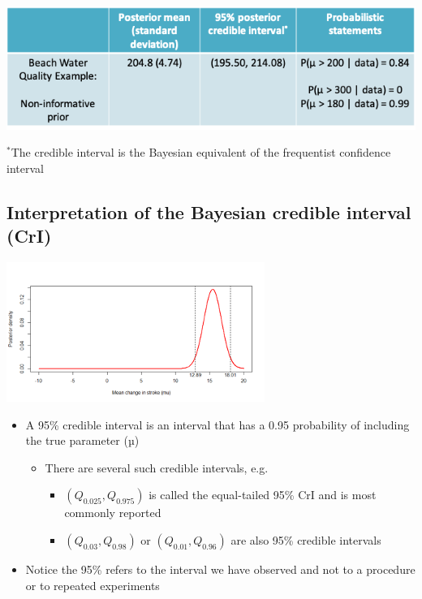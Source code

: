 \documentclass[
]{book}
\providecommand{\tightlist}{%
  \setlength{\itemsep}{0pt}\setlength{\parskip}{0pt}}
\begin{document}
\includegraphics[width=1\linewidth]{./6_26}

\(^*\)The credible interval is the Bayesian equivalent of the frequentist confidence interval

\hypertarget{interpretation-of-the-bayesian-credible-interval-cri}{%
\subsection{Interpretation of the Bayesian credible interval (CrI)}\label{interpretation-of-the-bayesian-credible-interval-cri}}

\includegraphics[width=0.5\linewidth]{./6_27}

\begin{itemize}
\tightlist
\item
  A 95\% credible interval is an interval that has a 0.95 probability of including the true parameter (µ)

  \begin{itemize}
  \tightlist
  \item
    There are several such credible intervals, e.g.

    \begin{itemize}
    \tightlist
    \item
      \((Q_{0.025}, Q_{0.975})\) is called the equal-tailed 95\% CrI and is most commonly reported
    \item
      \((Q_{0.03}, Q_{0.98})\) or \((Q_{0.01}, Q_{0.96})\) are also 95\% credible intervals
    \end{itemize}
  \end{itemize}
\item
  Notice the 95\% refers to the interval we have observed and not to a procedure or to repeated experiments
\end{itemize}
\end{document}
